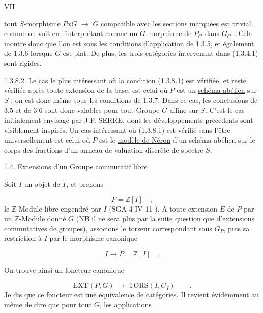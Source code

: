 VII

 tout $S$-morphisme $PxG$ $\longrightarrow$ $G$ compatible avec les sections marquées est trivial, comme on voit en l'interprétant comme un $G$-morphisme de $P_G$ dans $G_G$ . Cela montre donc que l'on est sous les conditions d'application de 1.3.5, et également de 1.3.6 lorsque $G$ est plat. De plus, les trois catégories intervenant dans (1.3.4.1) sont rigides.

1.3.8.2.  Le cas le plus intéressant où la condition (1.3.8.1) est vérifiée, et reste vérifiée après toute extension de la base, est celui où $P$ est un \underline{schéma abélien} sur $S$ ; on est donc même sous les conditions de 1.3.7. Dans ce cas, les conclusions de 3.5 et de 3.6 sont donc valables pour tout Groupe $G$ affine sur $S$. C'est le cas initialement envisagé par J.P. SERRE, dont les développements précédents sont visiblement inspirés. Un cas intéressant où (1.3.8.1) est vérifié sans l'être universellement est celui où $P$ est le \underline{modèle de Néron} d'un schéma abélien sur le corps des fractions d'un anneau de valuation discrète de spectre $S$.


1.4.  \underline{Extensions d'un Groupe commutatif libre}

Soit $I$ un objet de $\underline{T}$, et prenons

\begin{equation}\tag{1.4.1}
P = \mathbb{Z}[I] \quad ,
\end{equation}
le $\mathbb{Z}$-Module libre engendré par $I$ (SGA 4 IV 11 ). A toute extension $E$ de $P$ par un $\mathbb{Z}$-Module donné $G$ (NB il ne sera plus par la suite question que d'extensions commutatives de groupes), associons le torseur correspondant sous $G_P$, puis sa restriction à $I$ par le morphisme canonique

\begin{equation*}
I \longrightarrow P = \mathbb{Z}[I] \quad .
\end{equation*}


On trouve ainsi un foncteur canonique

\begin{equation}\tag{1.4.2}
\mathrm{EXT}(P,G) \ \longrightarrow\ \mathrm{TORS}(I,G_I) \qquad .
\end{equation}
Je dis que ce foncteur est une \underline{équivalence de catégories}. Il revient évidemment au même de dire que pour tout $G$, les applications

